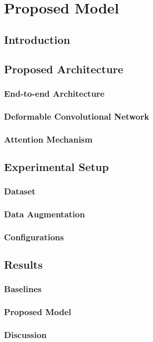 \chapter{Proposed Model} \label{chap:proposed_model}
    \section{Introduction}\label{sec:proposed_intro}

    \section{Proposed Architecture}\label{sec:proposed_arch}
    	\subsection{End-to-end Architecture}
    	\subsection{Deformable Convolutional Network}
    	\subsection{Attention Mechanism}

    \section{Experimental Setup}\label{sec:proposed_setup}
    	\subsection{Dataset}
    	\subsection{Data Augmentation}
    	\subsection{Configurations}


    \section{Results}
    	\subsection{Baselines}
    	\subsection{Proposed Model}
    	\subsection{Discussion}
    	
